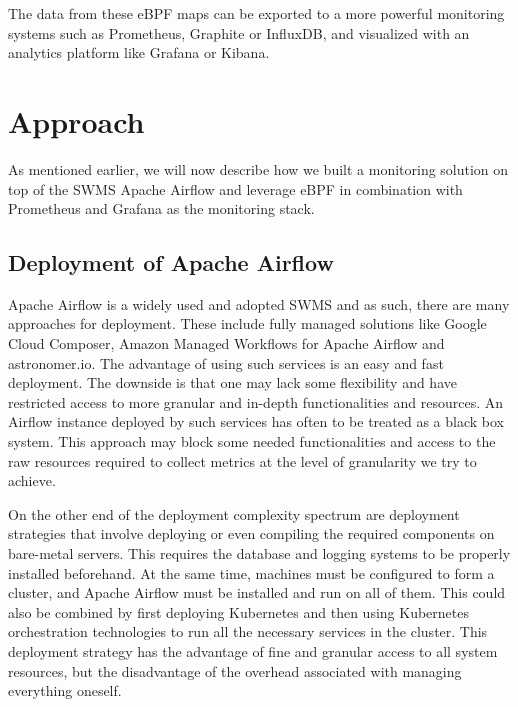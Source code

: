 \documentclass[a4paper,journal]{IEEEtran}
\begin{document}
The data from these eBPF maps can be exported to a more powerful monitoring systems such as Prometheus, Graphite or InfluxDB, and  visualized with an analytics platform like Grafana or Kibana.


\section{Approach}
\label{sec:approach}
As mentioned earlier, we will now describe how we  built a monitoring solution on top of the SWMS Apache Airflow and leverage eBPF in combination with Prometheus and Grafana as the monitoring stack.

\subsection{Deployment of Apache Airflow}
Apache Airflow is a widely used and adopted SWMS and as such, there are many approaches for deployment. These include fully managed solutions like Google Cloud Composer, Amazon Managed Workflows for Apache Airflow and astronomer.io. The advantage of using such services is an easy and fast deployment. The downside is that one may lack some flexibility and have restricted access to more granular and in-depth functionalities and resources. An Airflow instance deployed by such services has often to be treated as a black box system. This approach may block some needed functionalities and access to the raw resources required to collect metrics at the level of granularity we try to achieve.

On the other end of the deployment complexity spectrum are deployment strategies that involve deploying or even compiling the required components on bare-metal servers. This requires the database and logging systems to be properly installed beforehand. At the same time, machines must be configured to form a cluster, and Apache Airflow must be installed and run on all of them. This could also be combined by first deploying Kubernetes and then using Kubernetes orchestration technologies to run all the necessary services in the cluster. This deployment strategy has the advantage of fine and granular access to all system resources, but the disadvantage of the overhead associated with managing everything oneself.
\end{document}
